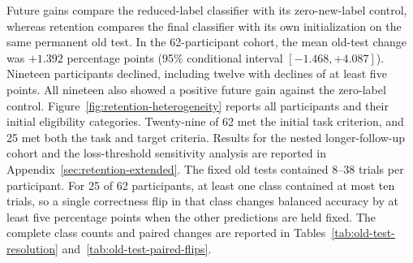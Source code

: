 \documentclass[11pt,a4paper]{article}
\begin{document}
Future gains compare the reduced-label classifier with its zero-new-label control, whereas retention compares the final classifier with its own initialization on the same permanent old test. In the 62-participant cohort, the mean old-test change was $+1.392$ percentage points (95\% conditional interval $[-1.468,+4.087]$). Nineteen participants declined, including twelve with declines of at least five points. All nineteen also showed a positive future gain against the zero-label control. Figure~\ref{fig:retention-heterogeneity} reports all participants and their initial eligibility categories. Twenty-nine of 62 met the initial task criterion, and 25 met both the task and target criteria. Results for the nested longer-follow-up cohort and the loss-threshold sensitivity analysis are reported in Appendix~\ref{sec:retention-extended}. The fixed old tests contained 8--38 trials per participant. For 25 of 62 participants, at least one class contained at most ten trials, so a single correctness flip in that class changes balanced accuracy by at least five percentage points when the other predictions are held fixed. The complete class counts and paired changes are reported in Tables~\ref{tab:old-test-resolution} and~\ref{tab:old-test-paired-flips}.
\end{document}

